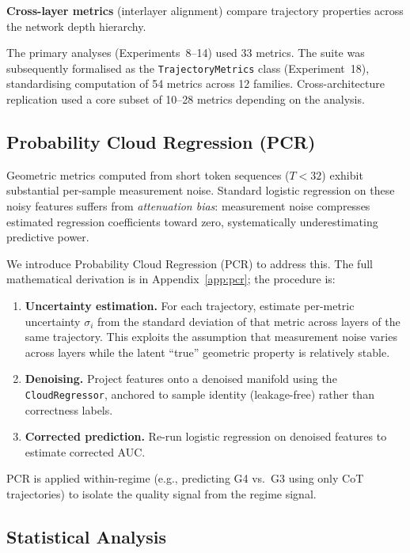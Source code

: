 \documentclass[11pt,twocolumn]{article}
\begin{document}
\textbf{Cross-layer metrics} (interlayer alignment) compare trajectory properties across the network depth hierarchy.

The primary analyses (Experiments~8--14) used 33 metrics. The suite was subsequently formalised as the \texttt{TrajectoryMetrics} class (Experiment~18), standardising computation of 54 metrics across 12 families. Cross-architecture replication used a core subset of 10--28 metrics depending on the analysis.

\subsection{Probability Cloud Regression (PCR)}
\label{sec:pcr_methods}

Geometric metrics computed from short token sequences ($T < 32$) exhibit substantial per-sample measurement noise. Standard logistic regression on these noisy features suffers from \emph{attenuation bias}: measurement noise compresses estimated regression coefficients toward zero, systematically underestimating predictive power.

We introduce Probability Cloud Regression (PCR) to address this. The full mathematical derivation is in Appendix~\ref{app:pcr}; the procedure is:

\begin{enumerate}[nosep, leftmargin=*]
    \item \textbf{Uncertainty estimation.} For each trajectory, estimate per-metric uncertainty $\sigma_i$ from the standard deviation of that metric across layers of the same trajectory. This exploits the assumption that measurement noise varies across layers while the latent ``true'' geometric property is relatively stable.
    \item \textbf{Denoising.} Project features onto a denoised manifold using the \texttt{CloudRegressor}, anchored to sample identity (leakage-free) rather than correctness labels.
    \item \textbf{Corrected prediction.} Re-run logistic regression on denoised features to estimate corrected AUC.
\end{enumerate}

PCR is applied within-regime (e.g., predicting G4 vs.\ G3 using only CoT trajectories) to isolate the quality signal from the regime signal.

\subsection{Statistical Analysis}
\end{document}
